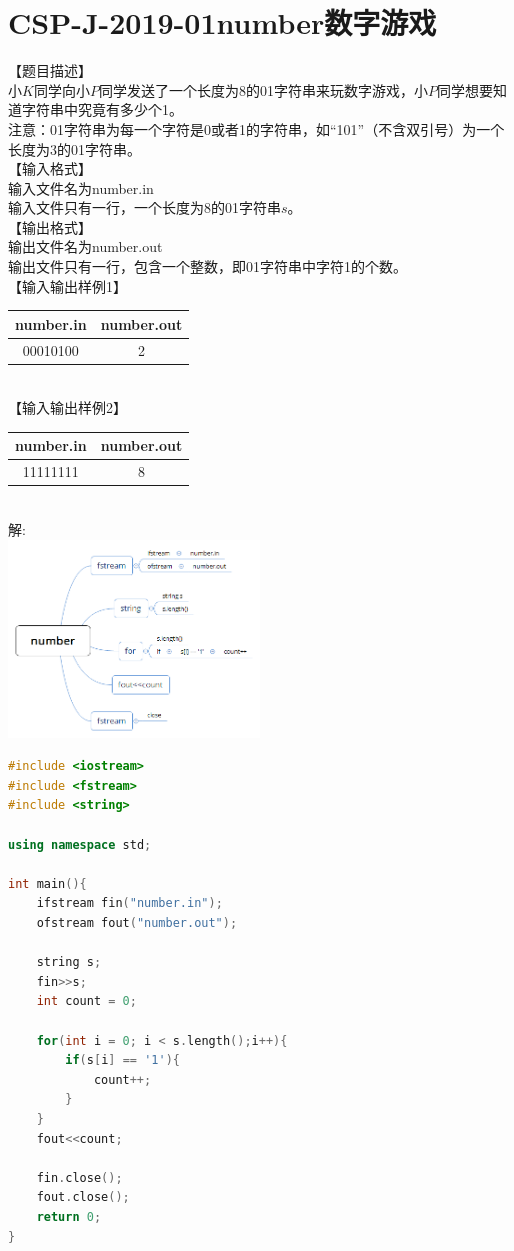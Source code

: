 \documentclass[12pt,twiside,a4paper]{ctexbook}
\numberwithin{chapter}{part}
\begin{document}
\section{CSP-J-2019-01number数字游戏}
【题目描述】\\
小$K$同学向小$P$同学发送了一个长度为8的01字符串来玩数字游戏，小$P$同学想要知道字符串中究竟有多少个1。\\
注意：01字符串为每一个字符是0或者1的字符串，如“101”（不含双引号）为一个长度为3的01字符串。\\
【输入格式】\\
输入文件名为number.in\\
输入文件只有一行，一个长度为8的01字符串$s$。\\
【输出格式】\\
输出文件名为number.out\\
输出文件只有一行，包含一个整数，即01字符串中字符1的个数。\\
【输入输出样例1】\\
\begin{tabular}{|c|c|}
\hline
number.in & number.out\\
\hline
00010100 & 2\\
\hline
\end{tabular}\\
【输入输出样例2】\\
\begin{tabular}{|c|c|}
\hline
number.in & number.out\\
\hline
11111111 & 8\\
\hline
\end{tabular}\\
解:\\
\includegraphics[width=0.5\textwidth]{number.png}
\begin{lstlisting}[language=C++]
#include <iostream>
#include <fstream>
#include <string>

using namespace std;

int main(){
	ifstream fin("number.in");
	ofstream fout("number.out");

	string s;
	fin>>s;
	int count = 0;

	for(int i = 0; i < s.length();i++){
		if(s[i] == '1'){
			count++;
		}
	}
	fout<<count;

	fin.close();
	fout.close();
	return 0;
}
\end{lstlisting}
\end{document}
